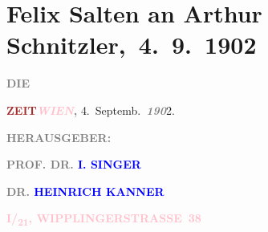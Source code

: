 

\renewcommand{\erwaehntePersonen}{Personen: Heinrich Kanner, Isidor Singer}
\renewcommand{\erwaehnteInstitutionen}{Institutionen: Die Zeit}
\renewcommand{\erwaehnteOrte}{Orte: Wien, Wipplingerstraße}
\renewcommand{\erwaehnteWerke}{Werke: Die griechische Tänzerin. Novellette, Die kleine Veronika}
\section[ Felix Salten an Arthur Schnitzler, 4. 9. 1902]{Felix Salten an Arthur Schnitzler, 4. 9. 1902}
\nopagebreak{}
\rehead{ }\normalsize\beginnumbering{}
\toendnotes[C]{\smallbreak\pagebreak[2]}
\toendnotes[C]{\smallbreak}
\pstart
           \noindent{}{\pb}\textcolor{gray}{\textbf{DIE}}\pend
           
\pstart
           \textcolor{gray}{\textbf{\textcolor{brown}{ZEIT}{}\ledrightnote{\textcolor{brown}{Die Zeit}}}}\hfill \textcolor{gray}{\textbf{\emph{\textcolor{pink}{WIEN}{}\ledrightnote{\textcolor{pink}{Wien}}},}}{ }4. Septemb. \textcolor{gray}{\textbf{\emph{190}}}2.\pend
           
\pstart
           \textcolor{gray}{\textbf{\textsc{\textbf{}}}}\pend
           
\pstart
           \textcolor{gray}{\textbf{HERAUSGEBER:}}\pend
           
\pstart
           \textcolor{gray}{\textbf{\textbf{PROF. DR. \textcolor{blue}{I. SINGER}{}\ledrightnote{\textcolor{blue}{Isidor Singer}}}}}\pend
           
\pstart
           \textcolor{gray}{\textbf{\textbf{DR. \textcolor{blue}{HEINRICH KANNER}{}\ledrightnote{\textcolor{blue}{Heinrich Kanner}}}}}\pend
           
\pstart
           \textcolor{gray}{\textbf{\textbf{}}}\pend
           
\pstart
           \textcolor{gray}{\textbf{\textcolor{pink}{I/\textsubscript{21},
                           WIPPLINGERSTRASSE 38}{}\ledrightnote{\textcolor{pink}{Wipplingerstraße}}}}\pend
           
